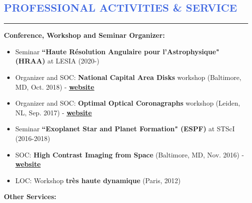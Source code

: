 \documentclass[11pt]{article}
\begin{document}
\vspace{-0.35cm}
\textcolor{RoyalBlue}{\section{\large PROFESSIONAL ACTIVITIES \& SERVICE}
\vspace{-0.35cm}\hrule}
\vspace{0.4cm}

\textbf{Conference, Workshop and Seminar Organizer:}
\vspace{0.3cm}
\begin{itemize} \itemsep -2pt
 \item \small Seminar \textbf{``Haute Résolution Angulaire pour l'Astrophysique" (HRAA)} at LESIA (2020-)
 \item \small Organizer and SOC: \textbf{National Capital Area Disks} workshop (Baltimore, MD, Oct. 2018) - \href{https://sites.google.com/view/ncad7-at-jhu/ncad7}{\underline{\textbf{website}}}
 \item \small Organizer and SOC: \textbf{Optimal Optical Coronagraphs} workshop (Leiden, NL, Sep. 2017) - \href{https://www.lorentzcenter.nl/lc/web/2017/924/info.php3?wsid=924&venue=Snellius}{\underline{\textbf{website}}}
 \item \small Seminar \textbf{``Exoplanet Star and Planet Formation" (ESPF)} at STScI (2016-2018)
 \item \small SOC: \textbf{High Contrast Imaging from Space} (Baltimore, MD, Nov. 2016) - \href{http://www.cvent.com/events/high-contrast-imaging-in-space-workshop/event-summary-eb3bb6bd54a342c5a15678daa49be683.aspx}{\underline{\textbf{website}}}
 \item \small LOC: Workshop \textbf{très haute dynamique} (Paris, 2012)
\end{itemize}
\vspace{0.1cm}
\textbf{Other Services:}
\end{document}
